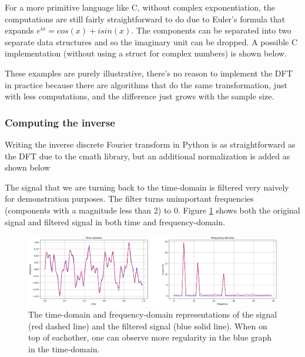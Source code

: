 

For a more primitive language like C, without complex exponentiation, the computations are still fairly straightforward to do due to Euler's formula that expands $e^{ix} = cos(x) + isin(x)$. The components can be separated into two separate data structures and so the imaginary unit can be dropped. A possible C implementation (without using a struct for complex numbers) is shown below. 



These examples are purely illustrative, there's no reason to implement the DFT in practice because there are algorithms that do the same transformation, just with less computations, and the difference just grows with the sample size.
\subsubsection{Computing the inverse}
Writing the inverse discrete Fourier transform in Python is as straightforward as the DFT due to the cmath library, but an additional normalization is added as shown below 




The signal that we are turning back to the time-domain is filtered very naively for demonstration purposes. The filter turns unimportant frequencies (components with a magnitude less than 2) to 0. Figure \ref{fig:DFT-IDFT} shows both the original signal and filtered signal in both time and frequency-domain.

\begin{figure}[ht]
    \centering
    \includegraphics[width=\textwidth]{./images/filtered_signal.png}
    \caption{The time-domain and frequency-domain representations of the signal (red dashed line) and the filtered signal (blue solid line). When on top of eachother, one can observe more regularity in the blue graph in the time-domain.\label{fig:DFT-IDFT}}
\end{figure}

